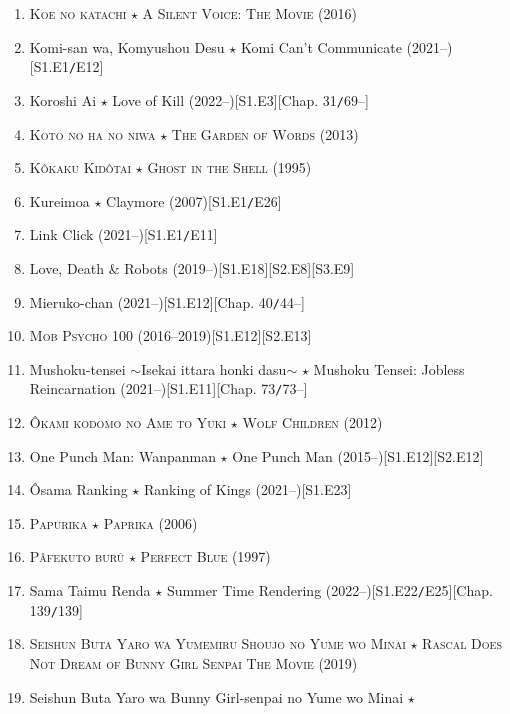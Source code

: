 \documentclass[oneside]{book}
\numberwithin{equation}{section}
\begin{document}
\begin{enumerate}
    \item \textsc{Koe no katachi $\star$ A Silent Voice: The Movie} (2016)
    \item Komi-san wa, Komyushou Desu $\star$ Komi Can't Communicate (2021--)\hfill[S1.E1\texttt{/}E12]
    \item Koroshi Ai $\star$ Love of Kill (2022--)\hfill[S1.E3][Chap. 31\texttt{/}69--]
    \item \textsc{Koto no ha no niwa $\star$ The Garden of Words} (2013)
    \item \textsc{K\^okaku Kid\^otai $\star$ Ghost in the Shell} (1995)
    \item Kureimoa $\star$ Claymore (2007)\hfill[S1.E1\texttt{/}E26]
    \item Link Click (2021--)\hfill[S1.E1\texttt{/}E11]
    \item Love, Death \& Robots (2019--)\hfill[S1.E18][S2.E8][S3.E9]
    \item Mieruko-chan (2021--)\hfill[S1.E12][Chap. 40\texttt{/}44--]
    \item \textsc{Mob Psycho 100} (2016--2019)\hfill[S1.E12][S2.E13]
    \item Mushoku-tensei $\sim$Isekai ittara honki dasu$\sim$ $\star$ Mushoku Tensei: Jobless Reincarnation (2021--)\hfill[S1.E11][Chap. 73\texttt{/}73--]
    \item \textsc{\^Okami kodomo no Ame to Yuki $\star$ Wolf Children} (2012)
    \item One Punch Man: Wanpanman $\star$ One Punch Man (2015--)\hfill[S1.E12][S2.E12]
    \item \^Osama Ranking $\star$ Ranking of Kings (2021--)\hfill[S1.E23]
    \item \textsc{Papurika $\star$ Paprika} (2006)
    \item \textsc{Pâfekuto burû $\star$ Perfect Blue} (1997)
    \item Sama Taimu Renda $\star$ Summer Time Rendering (2022--)\hfill[S1.E22\texttt{/}E25][Chap. 139\texttt{/}139]
    \item \textsc{Seishun Buta Yaro wa Yumemiru Shoujo no Yume wo Minai $\star$ Rascal Does Not Dream of Bunny Girl Senpai The Movie} (2019)
    \item Seishun Buta Yaro wa Bunny Girl-senpai no Yume wo Minai $\star$
    

\end{enumerate}
\end{document}
